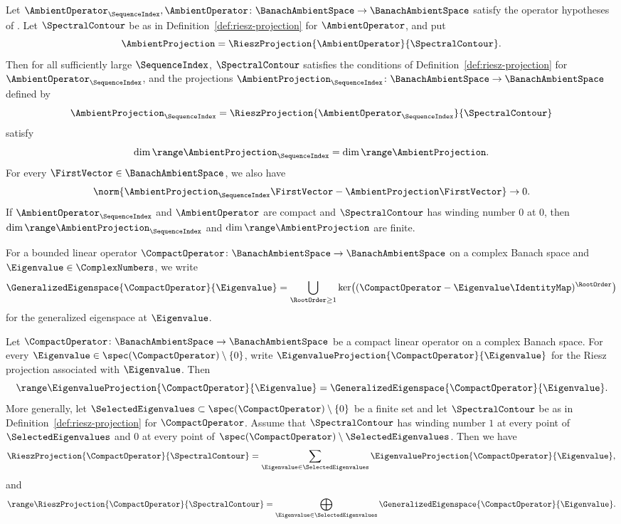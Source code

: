 \begin{theorem}\label{thm:riesz-convergence}
Let
$\AmbientOperator_\SequenceIndex,\AmbientOperator\colon\BanachAmbientSpace\to\BanachAmbientSpace$
satisfy the operator hypotheses of
.
Let
$\SpectralContour$
be as in Definition~\ref{def:riesz-projection} for
$\AmbientOperator$,
and put
\[
 \AmbientProjection=\RieszProjection{\AmbientOperator}{\SpectralContour}.
\]
Then for all sufficiently large
$\SequenceIndex$,
$\SpectralContour$
satisfies the conditions of Definition~\ref{def:riesz-projection} for
$\AmbientOperator_\SequenceIndex$,
and the projections
$\AmbientProjection_\SequenceIndex\colon\BanachAmbientSpace\to\BanachAmbientSpace$
defined by
\[
 \AmbientProjection_\SequenceIndex
 =\RieszProjection{\AmbientOperator_\SequenceIndex}{\SpectralContour}
\]
satisfy
\[
 \dim\range\AmbientProjection_\SequenceIndex=\dim\range\AmbientProjection.
\]
For every
$\FirstVector\in\BanachAmbientSpace$,
we also have
\[
 \norm{\AmbientProjection_\SequenceIndex\FirstVector-\AmbientProjection\FirstVector}\to0.
\]
If
$\AmbientOperator_\SequenceIndex$
and
$\AmbientOperator$
are compact and
$\SpectralContour$
has winding number
$0$
at
$0$,
then
$\dim\range\AmbientProjection_\SequenceIndex$
and
$\dim\range\AmbientProjection$
are finite.
\end{theorem}

For a bounded linear operator
$\CompactOperator\colon\BanachAmbientSpace\to\BanachAmbientSpace$
on a complex Banach space and
$\Eigenvalue\in\ComplexNumbers$,
we write
\[
 \GeneralizedEigenspace{\CompactOperator}{\Eigenvalue}
 =\bigcup_{\RootOrder\geq1}
  \ker\bigl((\CompactOperator-\Eigenvalue\IdentityMap)^\RootOrder\bigr)
\]
for the generalized eigenspace at
$\Eigenvalue$.

\begin{theorem}\label{lem:riesz-range-generalized-eigenspace}
Let
$\CompactOperator\colon\BanachAmbientSpace\to\BanachAmbientSpace$
be a compact linear operator on a complex Banach space.
For every
$\Eigenvalue\in\spec(\CompactOperator)\setminus\{0\}$,
write
$\EigenvalueProjection{\CompactOperator}{\Eigenvalue}$
for the Riesz projection associated with
$\Eigenvalue$.
Then
\[
 \range\EigenvalueProjection{\CompactOperator}{\Eigenvalue}
 =\GeneralizedEigenspace{\CompactOperator}{\Eigenvalue}.
\]
More generally, let
$\SelectedEigenvalues\subset\spec(\CompactOperator)\setminus\{0\}$
be a finite set and let
$\SpectralContour$
be as in Definition~\ref{def:riesz-projection} for
$\CompactOperator$.
Assume that
$\SpectralContour$
has winding number
$1$
at every point of
$\SelectedEigenvalues$
and
$0$
at every point of
$\spec(\CompactOperator)\setminus\SelectedEigenvalues$.
Then we have
\[
 \RieszProjection{\CompactOperator}{\SpectralContour}
 =\sum_{\Eigenvalue\in\SelectedEigenvalues}
   \EigenvalueProjection{\CompactOperator}{\Eigenvalue},
\]
and
\[
 \range\RieszProjection{\CompactOperator}{\SpectralContour}
 =\bigoplus_{\Eigenvalue\in\SelectedEigenvalues}
   \GeneralizedEigenspace{\CompactOperator}{\Eigenvalue}.
\]
\end{theorem}
